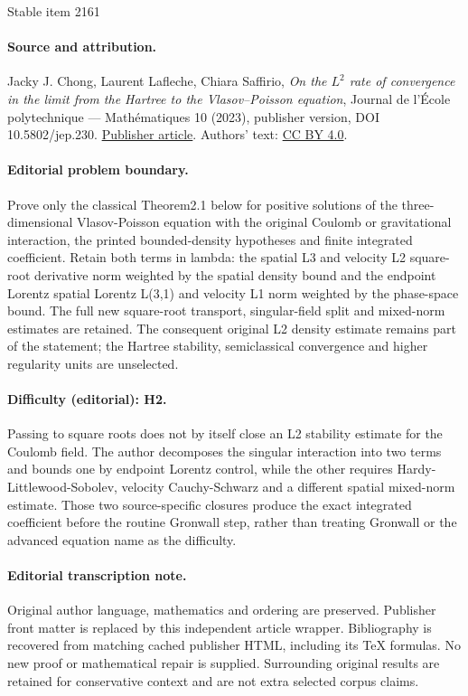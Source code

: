 \documentclass[11pt]{article}
\theoremstyle{definition}
\renewcommand {\(} {\lt(}
\renewcommand {\)} {\rt)}
\begin{document}
\begin{center}{\Large Stable item 2161}\end{center}
\paragraph{Source and attribution.}
Jacky J. Chong, Laurent Lafleche, Chiara Saffirio, \emph{On the $L^2$ rate of convergence in the limit from the Hartree to the Vlasov–Poisson equation}, Journal de l’École polytechnique — Mathématiques 10 (2023), publisher version, DOI 10.5802/jep.230. \href{https://jep.centre-mersenne.org/articles/10.5802/jep.230/}{Publisher article}. Authors' text: \href{https://creativecommons.org/licenses/by/4.0/}{CC BY 4.0}.
\paragraph{Editorial problem boundary.}
Prove only the classical Theorem2.1 below for positive solutions of the three-dimensional Vlasov-Poisson equation with the original Coulomb or gravitational interaction, the printed bounded-density hypotheses and finite integrated coefficient. Retain both terms in lambda: the spatial L3 and velocity L2 square-root derivative norm weighted by the spatial density bound and the endpoint Lorentz spatial Lorentz L(3,1) and velocity L1 norm weighted by the phase-space bound. The full new square-root transport, singular-field split and mixed-norm estimates are retained. The consequent original L2 density estimate remains part of the statement; the Hartree stability, semiclassical convergence and higher regularity units are unselected.
\paragraph{Difficulty (editorial): H2.}
Passing to square roots does not by itself close an L2 stability estimate for the Coulomb field. The author decomposes the singular interaction into two terms and bounds one by endpoint Lorentz control, while the other requires Hardy-Littlewood-Sobolev, velocity Cauchy-Schwarz and a different spatial mixed-norm estimate. Those two source-specific closures produce the exact integrated coefficient before the routine Gronwall step, rather than treating Gronwall or the advanced equation name as the difficulty.
\paragraph{Editorial transcription note.}
Original author language, mathematics and ordering are preserved. Publisher front matter is replaced by this independent article wrapper. Bibliography is recovered from matching cached publisher HTML, including its TeX formulas. No new proof or mathematical repair is supplied. Surrounding original results are retained for conservative context and are not extra selected corpus claims.
\clearpage
\end{document}

